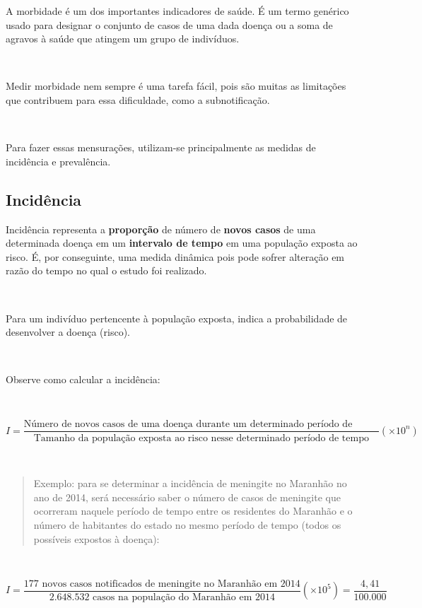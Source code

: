 \documentclass[
]{book}
\begin{document}
\hfill\break

A morbidade é um dos importantes indicadores de saúde. É um termo genérico usado para designar o conjunto de casos de uma dada doença ou a soma de agravos à saúde que atingem um grupo de indivíduos.

~

Medir morbidade nem sempre é uma tarefa fácil, pois são muitas as limitações que contribuem para essa dificuldade, como a subnotificação.

~

Para fazer essas mensurações, utilizam-se principalmente as medidas de incidência e prevalência.\\

\hypertarget{inciduxeancia}{%
\subsection{Incidência}\label{inciduxeancia}}

\hfill\break

Incidência representa a \textbf{proporção} de número de \textbf{novos casos} de uma determinada doença em um \textbf{intervalo de tempo} em uma população exposta ao risco. É, por conseguinte, uma medida dinâmica pois pode sofrer alteração em razão do tempo no qual o estudo foi realizado.

~

Para um indivíduo pertencente à população exposta, indica a probabilidade de desenvolver a doença (risco).

~

Observe como calcular a incidência:

~

\[
I=\frac{\text{Número de novos casos de uma doença durante um determinado período de tempo}}{\text{Tamanho da população exposta ao risco nesse determinado período de tempo}} (\times 10^{n})
\]

~

\begin{quote}
Exemplo: para se determinar a incidência de meningite no Maranhão no ano de 2014, será necessário saber o número de casos de meningite que ocorreram naquele período de tempo entre os residentes do Maranhão e o número de habitantes do estado no mesmo período de tempo (todos os possíveis expostos à doença):
\end{quote}

~

\[
I=\frac{\text{177 novos casos notificados de meningite no Maranhão em 2014}}{\text{2.648.532 casos na população do Maranhão em 2014}} (\times 10^{5}) = \frac{4,41}{100.000 }
\]
\end{document}
